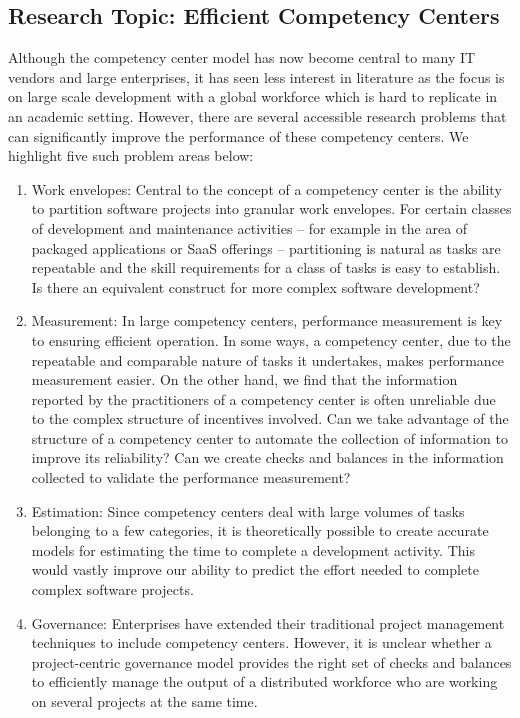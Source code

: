 \subsection{Research Topic: Efficient Competency Centers}

Although the competency center model has now become central to many IT vendors and large enterprises, it has seen less interest in literature as the focus is on large scale development with a global workforce which is hard to replicate in an academic setting. However, there are several accessible research problems that can significantly improve the performance of these competency centers. We highlight five such problem areas below:

\begin{enumerate}
\item Work envelopes: Central to the concept of a competency center is the ability to partition software projects into granular work envelopes. For certain classes of development and maintenance activities -- for example in the area of packaged applications or SaaS offerings -- partitioning is natural as tasks are repeatable and the skill requirements for a class of tasks is easy to establish. Is there an equivalent construct for more complex software development?
\item Measurement: In large competency centers, performance measurement is key to ensuring efficient operation. In some ways, a competency center, due to the repeatable and comparable nature of tasks it undertakes, makes performance measurement easier. On the other hand, we find that the information reported by the practitioners of a competency center is often unreliable due to the complex structure of incentives involved. Can we take advantage of the structure of a competency center to automate the collection of information to improve its reliability? Can we create checks and balances in the information collected to validate the performance measurement?
\item Estimation: Since competency centers deal with large volumes of tasks belonging to a few categories, it is theoretically possible to create accurate models for estimating the time to complete a development activity. This would vastly improve our ability to predict the effort needed to complete complex software projects.
\item Governance: Enterprises have extended their traditional project management techniques to include competency centers. However, it is unclear whether a project-centric governance model provides the right set of checks and balances to efficiently manage the output of a distributed workforce who are working on several projects at the same time.

\end{enumerate}
